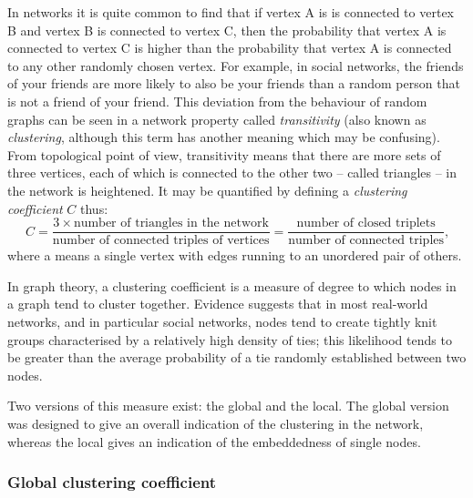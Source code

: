       In networks it is quite common to find that if vertex A is is connected to vertex B and vertex B is connected to vertex C, then the probability that vertex A is connected to vertex C is higher than the probability that vertex A is connected to any other randomly chosen vertex. For example, in social networks, the friends of your friends are more likely to also be your friends than a random person that is not a friend of your friend. This deviation from the behaviour of random graphs can be seen in a network property called \emph{transitivity} (also known as \emph{clustering}, although this term has another meaning which may be confusing). From topological point of view, transitivity means that there are more sets of three vertices, each of which is connected to the other two -- called triangles -- in the network is heightened. It may be quantified by defining a \emph{clustering coefficient} $C$ thus:
      \begin{equation}
        C = \frac{3 \times \mbox{number of triangles in the network}}{\mbox{number of connected triples of vertices}} = \frac{\mbox{number of closed triplets}}{\mbox{number of connected triples}} \mbox{,}
      \end{equation}
      where a  means a single vertex with edges running to an unordered pair of others.

      In graph theory, a clustering coefficient is a measure of degree to which nodes in a graph tend to cluster together. Evidence suggests that in most real-world networks, and in particular social networks, nodes tend to create tightly knit groups characterised by a relatively high density of ties; this likelihood tends to be greater than the average probability of a tie randomly established between two nodes\cite{HollandLeinhardt1971,WattsStrogatz1998}.

      Two versions of this measure exist: the global and the local. The global version was designed to give an overall indication of the clustering in the network, whereas the local gives an indication of the embeddedness of single nodes.

      \subsubsection{Global clustering coefficient}

